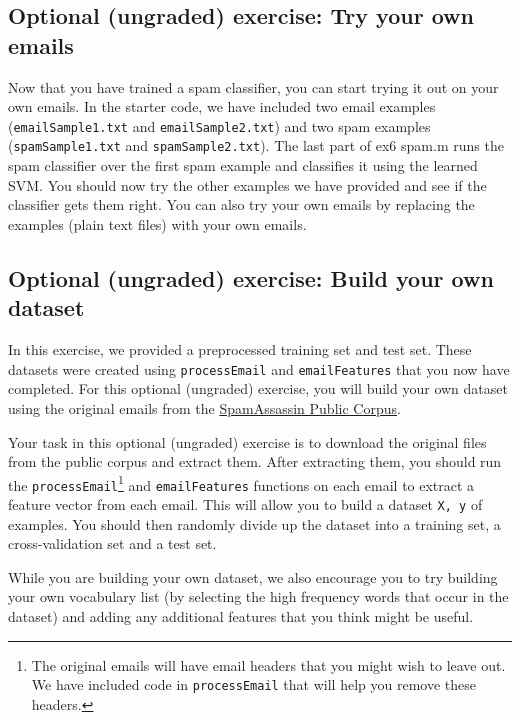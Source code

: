 \documentclass[12pt]{article}
\begin{document}
\subsection{Optional (ungraded) exercise: Try your own emails}

Now that you have trained a spam classifier, you can start trying it out on your own emails. In the starter code, we have included two email examples (\texttt{emailSample1.txt} and \texttt{emailSample2.txt}) and two spam examples (\texttt{spamSample1.txt} and \texttt{spamSample2.txt}). The last part of ex6 spam.m runs the spam classifier over the first spam example and classifies it using the learned SVM. You should now try the other examples we have provided and see if the classifier gets them right. You can also try your own emails by replacing the examples (plain text files) with your own emails. 

\subsection{Optional (ungraded) exercise: Build your own dataset}

In this exercise, we provided a preprocessed training set and test set. These datasets were created using \texttt{processEmail} and \texttt{emailFeatures} that you now have completed. For this optional (ungraded) exercise, you will build your own dataset using the original emails from the \href{http://spamassassin.apache.org/old/publiccorpus/}{SpamAssassin Public Corpus}.

Your task in this optional (ungraded) exercise is to download the original files from the public corpus and extract them. After extracting them, you should run the \texttt{processEmail}\footnote{The original emails will have email headers that you might wish to leave out. We have included code in \texttt{processEmail} that will help you remove these headers.} and \texttt{emailFeatures} functions on each email to extract a feature vector from each email. This will allow you to build a dataset \texttt{X, y} of examples. You should then randomly divide up the dataset into a training set, a cross-validation set and a test set.

While you are building your own dataset, we also encourage you to try building your own vocabulary list (by selecting the high frequency words that occur in the dataset) and adding any additional features that you think might be useful.
\end{document}
